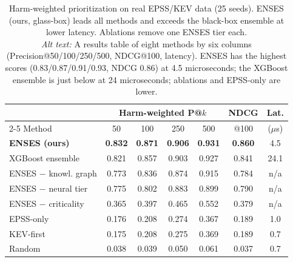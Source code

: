 \begin{table}[!t]
\caption{Harm-weighted prioritization on real EPSS/KEV data (25 seeds). ENSES
(ours, glass-box) leads all methods and exceeds the black-box ensemble at lower
latency. Ablations remove one ENSES tier each.\\[2pt]
\textit{Alt text:} A results table of eight methods by six columns
(Precision@50/100/250/500, NDCG@100, latency). ENSES has the highest scores
(0.83/0.87/0.91/0.93, NDCG 0.86) at 4.5 microseconds; the XGBoost ensemble is
just below at 24 microseconds; ablations and EPSS-only are lower.}
\label{tab:main}
\centering
\footnotesize
\begin{tabular}{@{}lcccccc@{}}
\toprule
& \multicolumn{4}{c}{Harm-weighted P@$k$} & NDCG & Lat. \\
\cmidrule(lr){2-5}
Method & 50 & 100 & 250 & 500 & @100 & ($\mu$s) \\
\midrule
\textbf{ENSES (ours)} & \textbf{0.832} & \textbf{0.871} & \textbf{0.906} & \textbf{0.931} & \textbf{0.860} & 4.5 \\
XGBoost ensemble      & 0.821 & 0.857 & 0.903 & 0.927 & 0.841 & 24.1 \\
\midrule
\;ENSES $-$ knowl. graph & 0.773 & 0.836 & 0.874 & 0.915 & 0.784 & n/a \\
\;ENSES $-$ neural tier  & 0.775 & 0.802 & 0.883 & 0.899 & 0.790 & n/a \\
\;ENSES $-$ criticality  & 0.365 & 0.397 & 0.465 & 0.552 & 0.379 & n/a \\
\midrule
EPSS-only             & 0.176 & 0.208 & 0.274 & 0.367 & 0.189 & 1.0 \\
KEV-first             & 0.175 & 0.208 & 0.275 & 0.369 & 0.189 & 0.7 \\
Random                & 0.038 & 0.039 & 0.050 & 0.061 & 0.037 & 0.7 \\
\bottomrule
\end{tabular}
\end{table}
